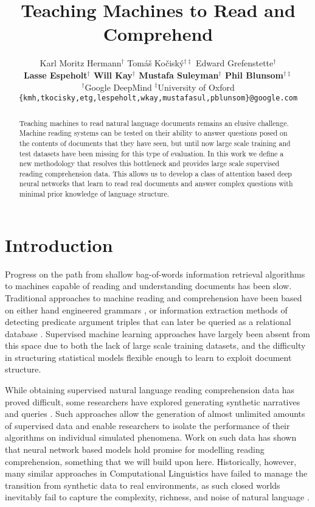 \documentclass{article}
\title{Teaching Machines to Read and Comprehend}
\author{
  Karl Moritz Hermann$^\dag$ \quad Tom\'a\v{s} Ko\v{c}isk\'y$^{\dag\ddag}$ \quad Edward Grefenstette$^\dag$ \\
  {\bf Lasse Espeholt$^\dag$ \quad Will Kay$^\dag$ \quad Mustafa Suleyman$^\dag$
  \quad Phil Blunsom$^{\dag\ddag}$} \\
$^\dag$Google DeepMind \quad
$^\ddag$University of Oxford \\
\texttt{\{kmh,tkocisky,etg,lespeholt,wkay,mustafasul,pblunsom\}@google.com} \\
}
\begin{document}
\maketitle

\begin{abstract}
  Teaching machines to read natural language documents remains an elusive
  challenge. Machine reading systems can be tested on their ability to answer
  questions posed on the contents of documents that they have seen, but
  until now large scale training and test datasets have been missing for this
  type of evaluation.
  In this work we define a new methodology that resolves this bottleneck
  and provides large scale supervised reading comprehension data.
  This allows us to develop a class of attention based
  deep neural networks that learn to read real documents
  and answer complex questions with minimal prior knowledge of language
  structure.
\end{abstract}

\section{Introduction}
\label{introduction}

Progress on the path from shallow bag-of-words information retrieval
algorithms to machines capable of reading and understanding documents has been
slow. Traditional approaches to machine reading and comprehension have been
based on either hand engineered grammars \cite{Riloff:2000:RQA}, or information
extraction methods of detecting predicate argument triples that can later be
queried as a relational database \cite{Poon:2010:MRU}.
Supervised machine learning approaches have largely been absent from this space
due to both the lack of large scale training datasets, and the difficulty in
structuring statistical models flexible enough to learn to exploit document
structure.

While obtaining supervised natural language reading comprehension data has
proved difficult, some researchers have explored generating synthetic narratives
and queries \cite{Weston:2014:MN,Sukhbaatar:2015}. Such approaches allow
the generation of almost unlimited amounts of supervised data and enable
researchers to isolate the performance of their algorithms on individual
simulated phenomena. Work on such data has shown that neural network based
models hold promise for modelling reading comprehension, something that we
will build upon here.  Historically, however, many similar approaches in
Computational Linguistics have failed to manage the transition from synthetic
data to real environments, as such closed worlds inevitably fail to
capture the complexity, richness, and noise of natural language
\cite{Winograd:1972:UNL}.
\end{document}
